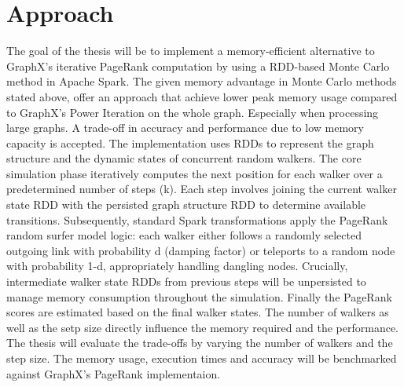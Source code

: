 \documentclass[a4paper,12pt]{article}
\begin{document}
\section{Approach}
The goal of the thesis will be to implement a memory-efficient alternative to GraphX's iterative PageRank computation by using a RDD-based Monte Carlo method in Apache Spark. The given memory advantage in Monte Carlo methods stated above, offer an approach that achieve lower peak memory usage compared to GraphX's Power Iteration on the whole graph. Especially when processing large graphs. A trade-off in accuracy and performance due to low memory capacity is accepted. 
The implementation uses RDDs to represent the graph structure  and the dynamic states of concurrent random walkers. The core simulation phase iteratively computes the next position for each walker over a predetermined number of steps (k). Each step involves joining the current walker state RDD with the persisted graph structure RDD to determine available transitions. Subsequently, standard Spark transformations apply the PageRank random surfer model logic: each walker either follows a randomly selected outgoing link with probability d (damping factor) or teleports to a random node with probability 1-d, appropriately handling dangling nodes. Crucially, intermediate walker state RDDs from previous steps will be unpersisted to manage memory consumption throughout the simulation. Finally the PageRank scores are estimated based on the final walker states. The number of walkers as well as the setp size directly influence the memory required and the performance. The thesis will evaluate the trade-offs by varying the number of walkers and the step size. The memory usage, execution times and accuracy will be benchmarked against GraphX's PageRank implementaion.



\end{document}
